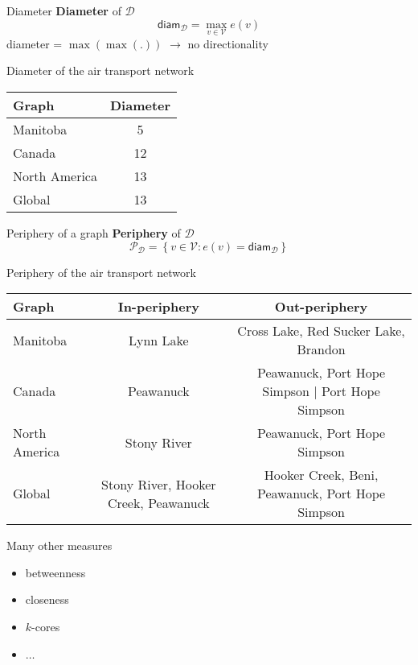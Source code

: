 \documentclass[aspectratio=169]{beamer}\usepackage[]{graphicx}\usepackage[]{xcolor}
\begin{document}
\begin{frame}{Diameter}
  \textbf{Diameter} of $\mathcal{D}$
  $$
  \mathsf{diam}_\mathcal{D}=\max_{v\in\mathcal{V}}e(v)
  $$
  diameter = $\max(\max(.))$ $\rightarrow$ no directionality
\end{frame}

\begin{frame}{Diameter of the air transport network}
  \begin{tabular}{lc}
    Graph & Diameter \\
    \hline
    Manitoba & 5 \\
    Canada & 12 \\
    North America & 13 \\
    Global & 13 \\
  \end{tabular}
\end{frame}

\begin{frame}{Periphery of a graph}
  \textbf{Periphery} of $\mathcal{D}$
  $$
  \mathcal{P}_\mathcal{D}=\left\{v\in\mathcal{V}:e(v)=\mathsf{diam}_\mathcal{D}\right\}
  $$
\end{frame}

\begin{frame}{Periphery of the air transport network}
  \begin{tabular}{lcc}
    Graph & In-periphery & Out-periphery \\
    \hline
    Manitoba & Lynn Lake & Cross Lake, Red Sucker Lake, Brandon \\
    Canada & Peawanuck & Peawanuck, Port Hope Simpson | Port Hope Simpson \\
    North America & Stony River & Peawanuck, Port Hope Simpson \\
    Global & Stony River, Hooker Creek, Peawanuck & Hooker Creek, Beni, Peawanuck, Port Hope Simpson \\
  \end{tabular}
\end{frame}

\begin{frame}{Many other measures}
  \begin{itemize}
    \item betweenness
    \item closeness
    \item $k$-cores
    \item $\ldots$
  \end{itemize}
\end{frame}
\end{document}
